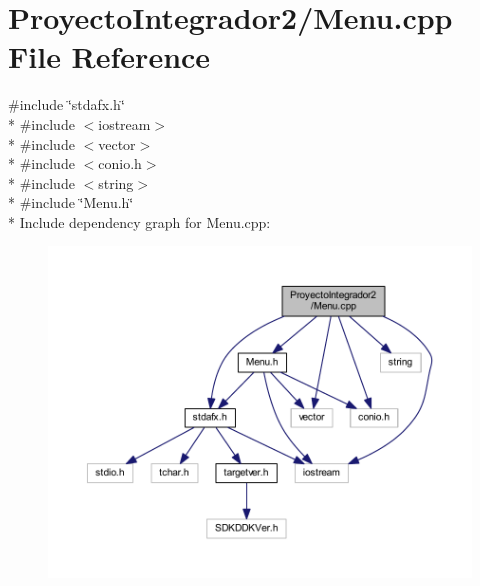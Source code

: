 \section{Proyecto\-Integrador2/\-Menu.cpp File Reference}
\label{_menu_8cpp}
{\ttfamily \#include \char`\"{}stdafx.\-h\char`\"{}}\\*
{\ttfamily \#include $<$iostream$>$}\\*
{\ttfamily \#include $<$vector$>$}\\*
{\ttfamily \#include $<$conio.\-h$>$}\\*
{\ttfamily \#include $<$string$>$}\\*
{\ttfamily \#include \char`\"{}Menu.\-h\char`\"{}}\\*
Include dependency graph for Menu.\-cpp\-:\nopagebreak
\begin{figure}[H]
\begin{center}
\leavevmode
\includegraphics[width=350pt]{_menu_8cpp__incl}
\end{center}
\end{figure}
